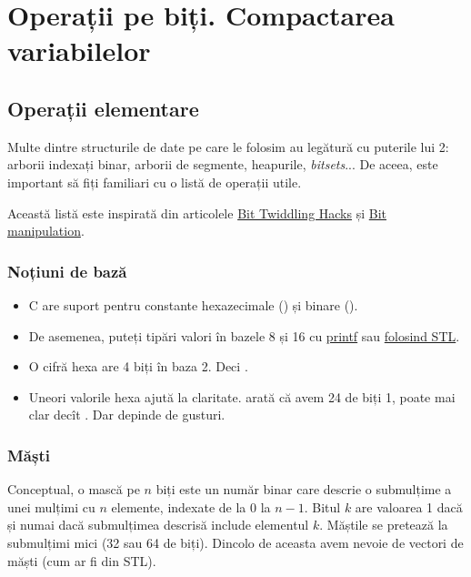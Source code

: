 \documentclass[../main.tex]{subfiles}
\begin{document}
\chapter{Operații pe biți. Compactarea variabilelor}

\section{Operații elementare}

Multe dintre structurile de date pe care le folosim au legătură cu puterile lui 2: arborii indexați binar, arborii de segmente, heapurile, \textit{bitsets}... De aceea, este important să fiți familiari cu o listă de operații utile.

Această listă este inspirată din articolele \href{https://graphics.stanford.edu/~seander/bithacks.html}{Bit Twiddling Hacks} și \href{https://cp-algorithms.com/algebra/bit-manipulation.html}{Bit manipulation}.

\subsection{Noțiuni de bază}

\begin{itemize}
  \item C are suport pentru constante hexazecimale () și binare ().

  \item De asemenea, puteți tipări valori în bazele 8 și 16 cu \href{https://linux.die.net/man/3/printf}{printf} sau \href{https://en.cppreference.com/w/cpp/io/manip/hex}{folosind STL}.

  \item O cifră hexa are 4 biți în baza 2. Deci .

  \item Uneori valorile hexa ajută la claritate.  arată că avem 24 de biți 1, poate mai clar decît . Dar depinde de gusturi.
\end{itemize}

\subsection{Măști}

Conceptual, o mască pe $n$ biți este un număr binar care descrie o submulțime a unei mulțimi cu $n$ elemente, indexate de la $0$ la $n-1$. Bitul $k$ are valoarea 1 dacă și numai dacă submulțimea descrisă include elementul $k$. Măștile se pretează la submulțimi mici (32 sau 64 de biți). Dincolo de aceasta avem nevoie de vectori de măști (cum ar fi  din STL).
\end{document}
